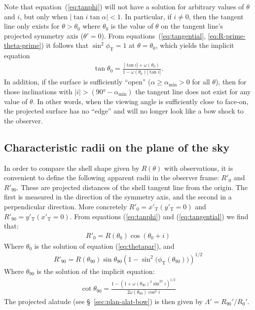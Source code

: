 \documentclass[useAMS, usenatbib, a4paper]{mnras}
\newcommand\T{_{\mathrm{\scriptscriptstyle T}}}
\begin{document}
Note that equation~(\ref{eq:tanphi}) will not have a solution for
arbitrary values of $\theta$ and $i$, but only when
$|\tan i\tan\alpha|<1$. In particular, if $i\neq 0$, then the tangent line
only exists for \(\theta > \theta_{0}\) where \(\theta_{0}\) is the value of
\(\theta\) on the tangent line's projected symmetry axis
(\(\theta' = 0\)).  From equations~(\ref{eq:tangential},
\ref{eq:R-prime-theta-prime}) it follows that \(\sin^2\phi\T = 1\) at
\(\theta = \theta_0\), which yields the implicit equation
\begin{align}
\tan\theta_{0} = \frac{|\tan i| + \omega(\theta_{0})}{1-\omega(\theta_{0}) |\tan i|} . 
\label{eq:thetapar}
\end{align}
In addition, if the surface is sufficiently ``open''
(\(\alpha \ge \alpha_{\mathrm{min}} > 0\) for all \(\theta\)), then for those
inclinations with
\(\vert i\vert > (\ang{90} - \alpha_{\mathrm{min}}) \) the tangent line does not exist
for any value of \(\theta\).  In other words, when the viewing angle is
sufficiently close to face-on, the projected surface has no ``edge''
and will no longer look like a bow shock to the observer.

\subsection{Characteristic radii on the plane of the sky}

In order to compare the shell shape given by $R(\theta)$ with observations,
it is convenient to define the following apparent radii in the
observer frame: $R'_{0}$ and $R'_{90}$. These are projected distances
of the shell tangent line from the origin. The first is measured in
the direction of the symmetry axis, and the second in a perpendicular
direction. More concretely $R'_{0} = x'\T(y'\T=0)$ and
$R'_{90} = y'\T(x'\T=0)$. From equations (\ref{eq:tanphi}) and
(\ref{eq:tangential}) we find that:
\begin{align}
R'_{0} = R(\theta_{0})\cos(\theta_{0} + i) \label{eq:Rpar} 
\end{align}
Where $\theta_{0}$ is the solution of equation (\ref{eq:thetapar}), and
\begin{align}
  \label{eq:R90prime}
R'_{90} = R(\theta_{90})\sin\theta_{90}\left(1-\sin^2\bigl(\phi\T(\theta_{90})\bigr)\right)^{1/2}
\end{align}
Where $\theta_{90}$ is the solution of the implicit equation:
\begin{align}
  \label{eq:th90}
\cot\theta_{90} = \frac{1-\left(1+\omega(\theta_{90})^2\sin^22i\right)^{1/2}}{2\omega(\theta_{90})\cos^2 i}
\end{align}
The projected alatude (see \S~\ref{sec:plan-alat-bow}) is then given
by \(\Lambda' = R_{90}' / R_0'\).
\end{document}
